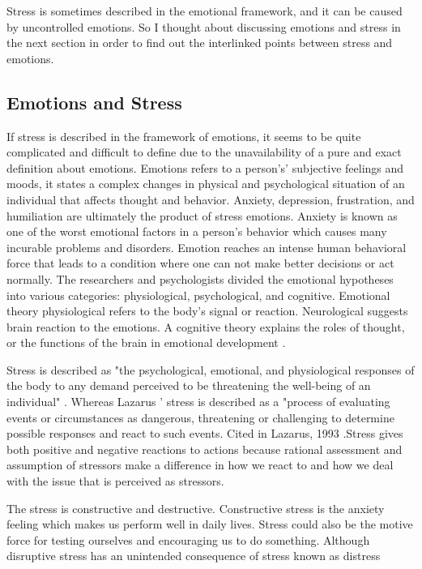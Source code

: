 Stress is sometimes described in the emotional framework, and it can be caused by uncontrolled emotions. So I thought about discussing emotions and stress in the next section in order to find out the interlinked points between stress and emotions. 

\subsection{Emotions and Stress}
If  stress  is  described  in  the  framework  of  emotions,  it  seems  to  be  quite  complicated  and difficult  to define  due  to the  unavailability  of  a  pure  and  exact  definition about  emotions. Emotions refers to a person's’ subjective feelings and moods, it states a complex changes in physical  and  psychological  situation  of  an  individual  that  affects  thought  and  behavior. Anxiety, depression, frustration, and humiliation are ultimately the product of stress emotions. Anxiety is known as one of the worst emotional factors in a person's behavior which causes many incurable problems and disorders. Emotion reaches an intense human behavioral force that leads to a condition where one can not make better decisions or act normally. The researchers and psychologists divided the emotional hypotheses into various categories: physiological, psychological, and cognitive.  Emotional theory physiological refers to the body's signal or reaction.  Neurological suggests brain reaction to the emotions. A cognitive theory explains the roles of thought, or the functions of the brain in emotional development \citep{Ashforth1995EmotionReappraisal}.

Stress is described as "the psychological, emotional, and physiological responses of the body to any demand perceived to be threatening the well-being of an individual" \citep{Bloisi2007ManagementBehaviour}. Whereas Lazarus ' stress is described as a "process of evaluating events or circumstances as dangerous, threatening or challenging to determine possible responses and react to such events. Cited in Lazarus, 1993 \citep{Bloisi2007ManagementBehaviour}.Stress gives both positive and negative reactions to actions because rational assessment and assumption of stressors make a difference in how we react to and how we deal with the issue that is perceived as stressors.

The stress is constructive and destructive. Constructive stress is the anxiety feeling which makes us perform well in daily lives. Stress could also be the motive force for testing ourselves and encouraging us to do something. Although disruptive stress has an unintended consequence of stress known as distress \citep{Bloisi2007ManagementBehaviour}


